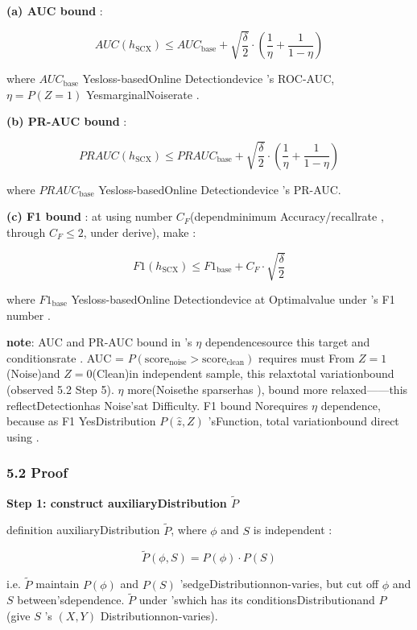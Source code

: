 \documentclass[
  12pt,
]{article}
\begin{document}
\textbf{(a) AUC bound }: 

\[AUC(h_{\text{SCX}}) \leq AUC_{\text{base}} + \sqrt{\frac{\delta}{2}} \cdot \left(\frac{1}{\eta} + \frac{1}{1-\eta}\right)\]

where \(AUC_{\text{base}}\) Yesloss-basedOnline Detectiondevice 's ROC-AUC, \(\eta = P(Z=1)\)
YesmarginalNoiserate . 

\textbf{(b) PR-AUC bound }: 

\[PRAUC(h_{\text{SCX}}) \leq PRAUC_{\text{base}} + \sqrt{\frac{\delta}{2}} \cdot \left(\frac{1}{\eta} + \frac{1}{1-\eta}\right)\]

where \(PRAUC_{\text{base}}\) Yesloss-basedOnline Detectiondevice 's PR-AUC. 

\textbf{(c) F1 bound }: at using number  \(C_F\)(dependminimum Accuracy/recallrate , through
\(C_F \leq 2\), under derive), make : 

\[F1(h_{\text{SCX}}) \leq F1_{\text{base}} + C_F \cdot \sqrt{\frac{\delta}{2}}\]

where \(F1_{\text{base}}\) Yesloss-basedOnline Detectiondevice at Optimalvalue under 's F1 number . 

\textbf{note}: AUC and  PR-AUC bound in 's \(\eta\)
dependencesource this target and conditionsrate . AUC =
\(P(\text{score}_{\text{noise}} > \text{score}_{\text{clean}})\)
requires must From \(Z=1\)(Noise)and 
\(Z=0\)(Clean)in independent sample, this relaxtotal variationbound (observed 5.2  Step
5). \(\eta\)
more(Noisethe sparserhas ), bound more relaxed------this reflectDetectionhas Noise'sat Difficulty. F1
bound Norequires  \(\eta\) dependence, because as  F1 YesDistribution \(P(\hat{z}, Z)\)
'sFunction, total variationbound direct using . 

\subsubsection{5.2 Proof}\label{ux8bc1ux660e}

\textbf{Step 1: construct auxiliaryDistribution \(\tilde{P}\)}

definition auxiliaryDistribution \(\tilde{P}\), where \(\phi\) and  \(S\) is independent : 

\[\tilde{P}(\phi, S) = P(\phi) \cdot P(S)\]

i.e. \(\tilde{P}\) maintain  \(P(\phi)\) and  \(P(S)\) 'sedgeDistributionnon-varies, but cut off
\(\phi\) and  \(S\) between'sdependence. \(\tilde{P}\) under 'swhich has its conditionsDistributionand  \(P\)
(give  \(S\) 's \((X,Y)\) Distributionnon-varies). 
\end{document}
